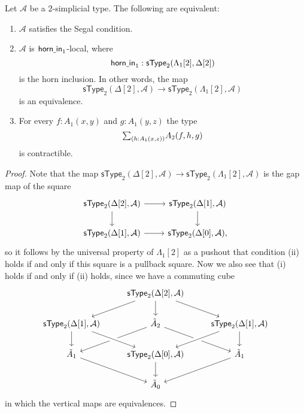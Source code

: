 \begin{prp}
Let $\mathcal{A}$ be a $2$-simplicial type. The following are equivalent:
\begin{enumerate}
\item $\mathcal{A}$ satisfies the Segal condition.
\item $\mathcal{A}$ is $\mathsf{horn\underline{\ }{}in}_1$-local, where
\begin{equation*}
\mathsf{horn\underline{\ }{}in}_1 : \mathsf{sType}_2(\Lambda_1[2],\Delta[2])
\end{equation*}
is the horn inclusion. In other words, the map
\begin{equation*}
\mathsf{sType}_2(\Delta[2],\mathcal{A}) \to \mathsf{sType}_2(\Lambda_1[2],\mathcal{A})
\end{equation*}
is an equivalence.
\item For every $f:A_1(x,y)$ and $g:A_1(y,z)$ the type
\begin{equation*}
\sm{h:A_1(x,z)}A_2(f,h,g)
\end{equation*}
is contractible.
\end{enumerate}
\end{prp}

\begin{proof}
Note that the map $\mathsf{sType}_2(\Delta[2],\mathcal{A}) \to \mathsf{sType}_2(\Lambda_1[2],\mathcal{A})$ is the gap map of the square
\begin{equation*}
\begin{tikzcd}
\mathsf{sType}_2(\Delta[2],\mathcal{A}) \arrow[r] \arrow[d] & \mathsf{sType}_2(\Delta[1],\mathcal{A}) \arrow[d] \\
\mathsf{sType}_2(\Delta[1],\mathcal{A}) \arrow[r]  & \mathsf{sType}_2(\Delta[0],\mathcal{A}),
\end{tikzcd}
\end{equation*}
so it follows by the universal property of $\Lambda_1[2]$ as a pushout that condition (ii) holds if and only if this square is a pullback square. Now we also see that (i) holds if and only if (ii) holds, since we have a commuting cube
\begin{equation*}
\begin{tikzcd}
& \mathsf{sType}_2(\Delta[2],\mathcal{A}) \arrow[dl] \arrow[d] \arrow[dr] \\
\mathsf{sType}_2(\Delta[1],\mathcal{A}) \arrow[d] & \tilde{A}_2 \arrow[dl] \arrow[dr] & \mathsf{sType}_2(\Delta[1],\mathcal{A}) \arrow[d] \arrow[dl,crossing over] \\
\tilde{A}_1 \arrow[dr] & \mathsf{sType}_2(\Delta[0],\mathcal{A}) \arrow[from=ul,crossing over] \arrow[d] & \tilde{A}_1 \arrow[dl] \\
& \tilde{A}_0
\end{tikzcd}
\end{equation*}
in which the vertical maps are equivalences.
\end{proof}

